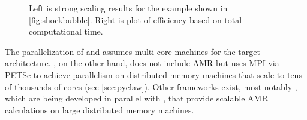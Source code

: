 \begin{figure}[h]
  \begin{center}
    \hfil
  \end{center}
  \caption{Left is strong scaling results for the \amrclaw example shown in
    \cref{fig:shockbubble}.
    Right is plot of efficiency based on total computational time.}
  \label{fig:amr_scaling}
\end{figure}

The parallelization of \amrclaw and \geoclaw assumes multi-core machines for the
target architecture.  \pyclaw, on the other hand, does not include AMR but uses
MPI via PETSc  to achieve parallelism on distributed memory machines that scale
to tens of thousands of cores (see \cref{sec:pyclaw}). Other frameworks exist,
most notably \forestclaw \cite{Burstedde:we}, which are being developed in
parallel with \amrclaw, that provide scalable AMR calculations on large
distributed
memory machines.
